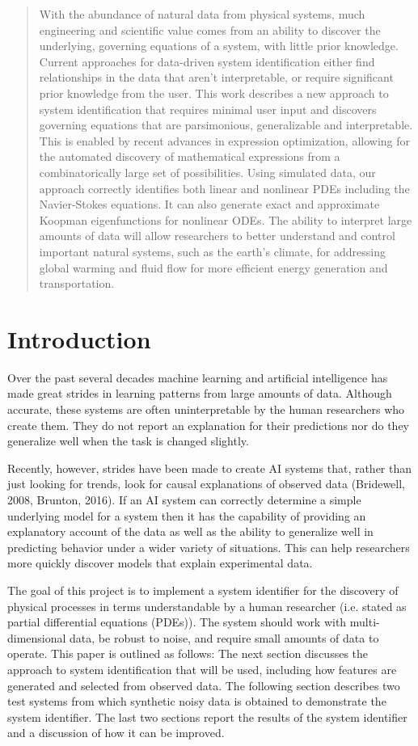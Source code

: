 \documentclass{article}
\begin{document}
\begin{abstract}
With the abundance of natural data from physical systems, much engineering and scientific value comes from an ability to discover the underlying, governing equations of a system, with little prior knowledge. Current approaches for data-driven system identification either find relationships in the data that aren't interpretable, or require significant prior knowledge from the user. This work describes a new approach to system identification that requires minimal user input and discovers governing equations that are parsimonious, generalizable and interpretable. This is enabled by recent advances in expression optimization, allowing for the automated discovery of mathematical expressions from a combinatorically large set of possibilities. Using simulated data, our approach correctly identifies both linear and nonlinear PDEs including the Navier-Stokes equations. It can also generate exact and approximate Koopman eigenfunctions for nonlinear ODEs. The ability to interpret large amounts of data will allow researchers to better understand and control important natural systems, such as the earth’s climate, for addressing global warming and fluid flow for more efficient energy generation and transportation.
\end{abstract}

\section{Introduction}
\label{introduction}

Over the past several decades machine learning and artificial intelligence has made great strides in learning patterns from large amounts of data. Although accurate, these systems are often uninterpretable by the human researchers who create them. They do not report an explanation for their predictions nor do they generalize well when the task is changed slightly.

Recently, however, strides have been made to create AI systems that, rather than just looking for trends, look for causal explanations of observed data (Bridewell, 2008, Brunton, 2016). If an AI system can correctly determine a simple underlying model for a system then it has the capability of providing an explanatory account of the data as well as the ability to generalize well in predicting behavior under a wider variety of situations. This can help researchers more quickly discover models that explain experimental data.

The goal of this project is to implement a system identifier for the discovery of physical processes in terms understandable by a human researcher (i.e. stated as partial differential equations (PDEs)). The system should work with multi-dimensional data, be robust to noise, and require small amounts of data to operate. This paper is outlined as follows: The next section discusses the approach to system identification that will be used, including how features are generated and selected from observed data. The following section describes two test systems from which synthetic noisy data is obtained to demonstrate the system identifier. The last two sections report the results of the system identifier and a discussion of how it can be improved.
\end{document}
